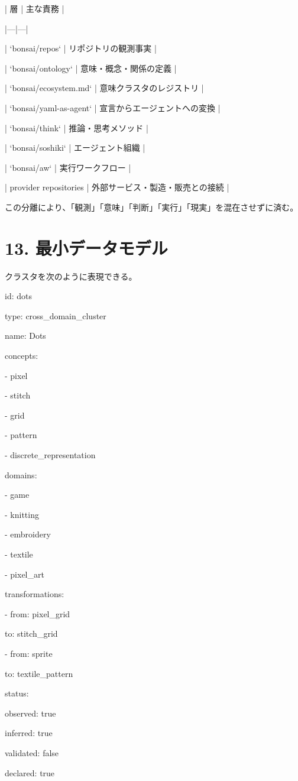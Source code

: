 \documentclass[a4paper,11pt]{jsarticle}
\begin{document}
| 層 | 主な責務 |


|---|---|


| `bonsai/repos` | リポジトリの観測事実 |


| `bonsai/ontology` | 意味・概念・関係の定義 |


| `bonsai/ecosystem.md` | 意味クラスタのレジストリ |


| `bonsai/yaml-as-agent` | 宣言からエージェントへの変換 |


| `bonsai/think` | 推論・思考メソッド |


| `bonsai/soshiki` | エージェント組織 |


| `bonsai/aw` | 実行ワークフロー |


| provider repositories | 外部サービス・製造・販売との接続 |


この分離により、「観測」「意味」「判断」「実行」「現実」を混在させずに済む。


\section{13. 最小データモデル}
クラスタを次のように表現できる。


id: dots


type: cross\_domain\_cluster


name: Dots


concepts:


  - pixel


  - stitch


  - grid


  - pattern


  - discrete\_representation


domains:


  - game


  - knitting


  - embroidery


  - textile


  - pixel\_art


transformations:


  - from: pixel\_grid


    to: stitch\_grid


  - from: sprite


    to: textile\_pattern


status:


  observed: true


  inferred: true


  validated: false


  declared: true
\end{document}
